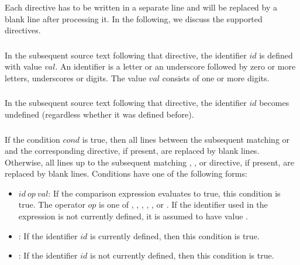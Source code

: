 Each directive has to be written in a separate line and will
be replaced by a blank line after processing it.
In the following, we discuss the supported directives.

\subsubsection*{}

In the subsequent source text following that directive,
the identifier $\mathit{id}$ is defined with value $\mathit{val}$.
An identifier is a letter or an underscore followed by zero or more letters,
underscores or digits.
The value $\mathit{val}$ consists of one or more digits.

\subsubsection*{}

In the subsequent source text following that directive,
the identifier $\mathit{id}$ becomes undefined
(regardless whether it was defined before).

\subsubsection*{}

If the condition $\mathit{cond}$ is true,
then all lines between the subsequent matching
 or  and the corresponding
 directive, if present,
are replaced by blank lines.
Otherwise, all lines up to the subsequent matching
, , or  directive, if present,
are replaced by blank lines.
%
Conditions have one of the following forms:
\begin{itemize}
\item
$\mathit{id}~\mathit{op}~\mathit{val}$:
If the comparison expression evaluates to true, this condition is true.
The operator $\mathit{op}$ is one of
\code{==}, \code{/=}, \code{<}, \code{<=}, \code{>}, or \code{>=}.
If the identifier used in the expression is not currently defined,
it is assumed to have value .
\item
{}:
If the identifier $\mathit{id}$ is currently defined,
then this condition is true.
\item
{}:
If the identifier $\mathit{id}$ is not currently defined,
then this condition is true.
\end{itemize}


